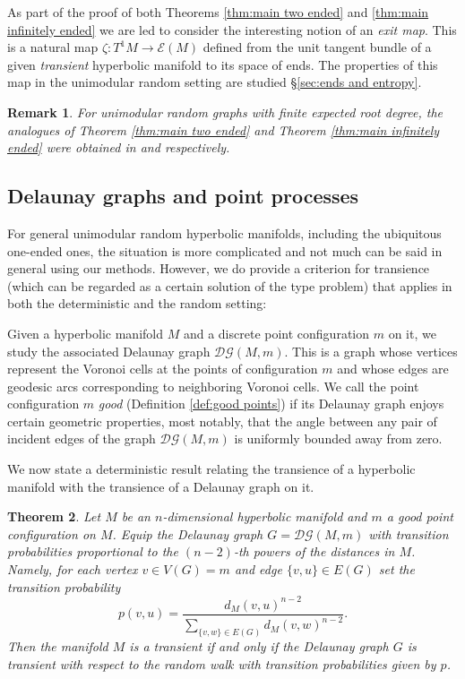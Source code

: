 \documentclass{amsart}
\newcommand{\DelanGraph}{\mathcal{DG}}
\newcommand{\Ends}[1]{\mathcal{E}\left(#1\right)}
\theoremstyle{plain}
\newtheorem{theorem}{Theorem}[section]
\newtheorem{remark}[theorem]{Remark}
\numberwithin{equation}{section}
\theoremstyle{definition}
\begin{document}
As part of the proof of both Theorems \ref{thm:main two ended} and \ref{thm:main infinitely ended} we are led to consider the interesting notion of an \emph{exit map}. This is a natural map $\zeta : T^1M \to \Ends{M}$ defined from the unit tangent bundle of a given \emph{transient} hyperbolic manifold to its space of ends. The properties of this map in the unimodular random setting are studied \S\ref{sec:ends and entropy}.

\begin{remark}
For unimodular random graphs with finite expected root degree, the analogues of Theorem \ref{thm:main two ended} and Theorem \ref{thm:main infinitely ended} were obtained 
in  \cite{angel2016unimodular} and 
\cite[Proposition 7.6]{angel2018hyperbolic} respectively.
\end{remark}

\subsection{Delaunay graphs and point processes}
For general unimodular random hyperbolic manifolds, including the ubiquitous one-ended ones, the situation is more complicated and not much can be said in general using our methods.
However, we do provide a criterion for transience (which can be regarded as a certain solution of the type problem) that applies in both the deterministic and the random setting: 

Given a hyperbolic manifold $M$ and a discrete point configuration $m$ on it,  we study the associated Delaunay graph $\DelanGraph(M,m)$. This is a graph whose vertices represent the Voronoi cells at the points of configuration $m$ and whose edges are geodesic arcs corresponding to neighboring Voronoi cells. We call the point configuration $m$ \emph{good} (Definition \ref{def:good points}) if its Delaunay graph enjoys certain geometric properties, most notably, that the angle between any pair of incident edges of the graph $\DelanGraph(M,m)$ is uniformly bounded away from zero.

We now state a deterministic result relating the transience of a hyperbolic manifold with the transience of a Delaunay graph on it.

\begin{theorem}
\label{thm:main:general transient condition}
Let $M$ be an $n$-dimensional hyperbolic manifold and $m$ a good point configuration on $M$. Equip the Delaunay graph $G = \DelanGraph (M,m)$  with transition probabilities proportional to the $(n-2)$-th powers of the distances in $M$. Namely,  for each vertex $v \in V(G) = m$ and edge $ \{v,u\} \in E(G)$  set the transition probability 
$$ p(v,u) = \frac{d_M(v,u)^{n-2}}{\sum_{\{v,w\} \in E(G)} d_M(v,w)^{n-2}}.$$
Then the manifold $M$ is a transient  if and only if the Delaunay graph $G$ is transient with respect to the random walk with transition probabilities given by $p$.
\end{theorem}
\end{document}
